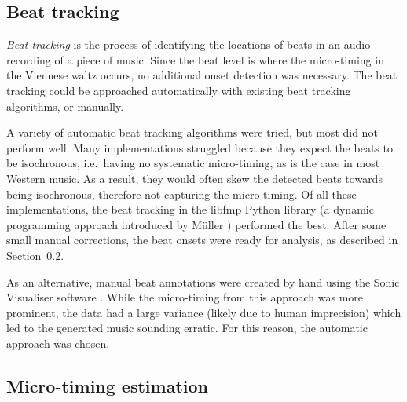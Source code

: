 \documentclass[12pt,twoside,openright]{report}
\begin{document}
\subsection{Beat tracking} \label{beat_tracking}

\emph{Beat tracking} is the process of identifying the locations of beats in an audio
recording of a piece of music. Since the beat level is where the micro-timing in
the Viennese waltz occurs, no additional onset detection was necessary. The beat
tracking could be approached automatically with existing beat tracking
algorithms, or manually.

A variety of automatic beat tracking algorithms were tried, but most did not
perform well. Many implementations struggled because they expect the beats to be
isochronous, i.e.\ having no systematic micro-timing, as is the case in most
Western music. As a result, they would often skew the detected beats towards
being isochronous, therefore not capturing the micro-timing. Of all these
implementations, the beat tracking in the libfmp Python library \cite{mueller2021} (a
dynamic programming approach introduced by Müller \cite{mueller2021b}) performed the best. After some
small manual corrections, the beat onsets were ready for analysis, as described
in Section~\ref{waltz_micro-timing}.

As an alternative, manual beat annotations were created by hand using the Sonic
Visualiser software \cite{cannam2010}. While the micro-timing from this approach was
more prominent, the data had a large variance (likely due to human imprecision) which led to the generated music sounding erratic. For this reason, the automatic approach was chosen.


\subsection{Micro-timing estimation} \label{waltz_micro-timing}
\end{document}
